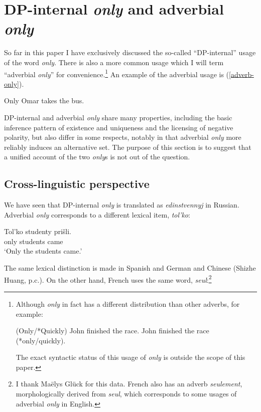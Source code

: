 \section{DP-internal \textit{only} and adverbial \textit{only} \label{sec:two-onlys}}
So far in this paper I have exclusively discussed the so-called ``DP-internal'' usage of the word \textit{only}. There is also a more common usage which I will term ``adverbial \textit{only}'' for convenience.\footnote{Although \textit{only} in fact has a different distribution than other adverbs, for example: \begin{exe} \ex (Only/*Quickly) John finished the race. \ex John finished the race (*only/quickly). \end{exe} The exact syntactic status of this usage of \textit{only} is outside the scope of this paper.} An example of the adverbial usage is (\ref{adverb-only}).

\begin{exe}
	\ex \label{adverb-only} Only Omar takes the bus.
\end{exe}

DP-internal and adverbial \textit{only} share many properties, including the basic inference pattern of existence and uniqueness and the licensing of negative polarity, but also differ in some respects, notably in that adverbial \textit{only} more reliably induces an alternative set. The purpose of this section is to suggest that a unified account of the two \textit{only}s is not out of the question.

\subsection{Cross-linguistic perspective}
We have seen that DP-internal \textit{only} is translated as \textit{edinstvennyj} in Russian. Adverbial \textit{only} corresponds to a different lexical item, \textit{tol'ko}:

\begin{exe}
	\ex \gll Tol'ko studenty pri\v{s}li.\\
	only students came\\
	\glt `Only the students came.'
\end{exe}

The same lexical distinction is made in Spanish and German \citep{mcnally08} and Chinese (Shizhe Huang, p.c.). On the other hand, French uses the same word, \textit{seul}:\footnote{I thank Ma\"{e}lys Gl\"{u}ck for this data. French also has an adverb \textit{seulement}, morphologically derived from \textit{seul}, which corresponds to some usages of adverbial \textit{only} in English.}

